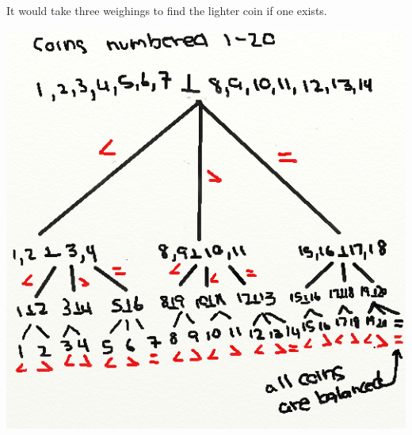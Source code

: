 \documentclass{article}
\begin{document}
It would take three weighings to find the lighter coin if one exists.

\includegraphics[width=\textwidth]{s3-1p28.png}
\end{document}
